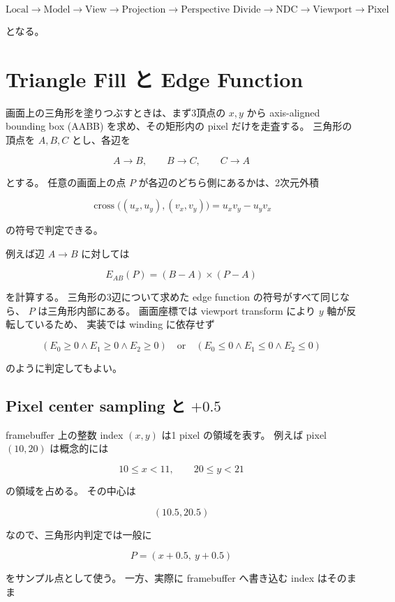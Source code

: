 \documentclass[a4paper,11pt]{ltjsarticle}
\begin{document}
\[
  \text{Local}
  \rightarrow
  \text{Model}
  \rightarrow
  \text{View}
  \rightarrow
  \text{Projection}
  \rightarrow
  \text{Perspective Divide}
  \rightarrow
  \text{NDC}
  \rightarrow
  \text{Viewport}
  \rightarrow
  \text{Pixel}
\]

となる。

\section{Triangle Fill と Edge Function}

画面上の三角形を塗りつぶすときは、まず3頂点の $x,y$ から
axis-aligned bounding box (AABB) を求め、その矩形内の pixel だけを走査する。
三角形の頂点を $A,B,C$ とし、各辺を

\[
  A\rightarrow B,\qquad
  B\rightarrow C,\qquad
  C\rightarrow A
\]

とする。
任意の画面上の点 $P$ が各辺のどちら側にあるかは、2次元外積

\[
  \operatorname{cross}\bigl((u_x,u_y),(v_x,v_y)\bigr)
  =u_xv_y-u_yv_x
\]

の符号で判定できる。

例えば辺 $A\rightarrow B$ に対しては

\[
  E_{AB}(P)
  =
  (B-A)\times(P-A)
\]

を計算する。
三角形の3辺について求めた edge function の符号がすべて同じなら、
$P$ は三角形内部にある。
画面座標では viewport transform により $y$ 軸が反転しているため、
実装では winding に依存せず

\[
  (E_0\ge0\land E_1\ge0\land E_2\ge0)
  \quad\text{or}\quad
  (E_0\le0\land E_1\le0\land E_2\le0)
\]

のように判定してもよい。

\subsection{Pixel center sampling と $+0.5$}

framebuffer 上の整数 index $(x,y)$ は1 pixel の領域を表す。
例えば pixel $(10,20)$ は概念的には

\[
  10\le x<11,\qquad 20\le y<21
\]

の領域を占める。
その中心は

\[
  (10.5,20.5)
\]

なので、三角形内判定では一般に

\[
  P=(x+0.5,\ y+0.5)
\]

をサンプル点として使う。
一方、実際に framebuffer へ書き込む index はそのまま
\end{document}

